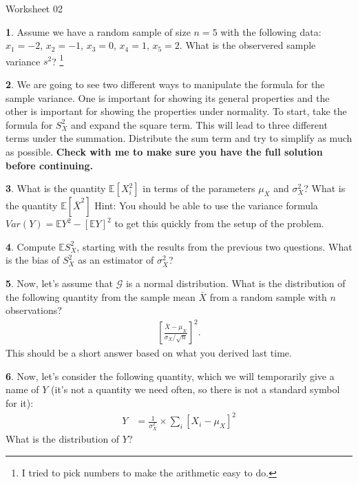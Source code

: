 \documentclass{tufte-handout}
\begin{document}
\justify

{\LARGE Worksheet 02}

\vspace*{18pt}


\textbf{1}. Assume we have a random sample of size $n = 5$ with the following data:
$x_1 = -2$, $x_2 = -1$, $x_3 = 0$, $x_4 = 1$, $x_5 = 2$. What is the observered
sample variance $s^2$? 
\footnote{
  I tried to pick numbers to make the arithmetic easy to do. 
}

\textbf{2}. We are going to see two different ways to manipulate the formula for the 
sample variance. One is important for showing its general properties and
the other is important for showing the properties under normality. To start,
take the formula for $S^2_X$ and expand the square term. This will lead to
three different terms under the summation. Distribute the sum term and
try to simplify as much as possible. \textbf{Check with me to make sure
you have the full solution before continuing.}

\textbf{3}. What is the quantity $\mathbb{E}[X_i^2]$ in terms of the parameters $\mu_X$ and
$\sigma_X^2$? What is the quantity $\mathbb{E}[\bar{X}^2]$ Hint: You should be
able to use the variance formula $Var(Y) = \mathbb{E}Y^2 - [\mathbb{E}Y]^2$
to get this quickly from the setup of the problem.

\textbf{4}. Compute $\mathbb{E}S_X^2$, starting with the results from the previous two
questions. What is the bias of $S_X^2$ as an estimator of $\sigma_X^2$?

\textbf{5}. Now, let's assume that $\mathcal{G}$ is a normal distribution. What is the
distribution of the following quantity from the sample mean $\bar{X}$ from a
random sample with $n$ observations?
\begin{align*}
\left[\frac{\bar{X} - \mu_X}{\sigma_X / \sqrt{n}} \right]^2.
\end{align*}
This should be a short answer based on what you derived last time.

\textbf{6}. Now, let's consider the following quantity, which we will temporarily
give a name of $Y$ (it's not a quantity we need often, so there is not
a standard symbol for it):
\begin{align*}
Y &= \frac{1}{\sigma_X^2} \times \sum_i \left[ X_i - \mu_X \right]^2 
\end{align*}
What is the distribution of $Y$?
\end{document}
